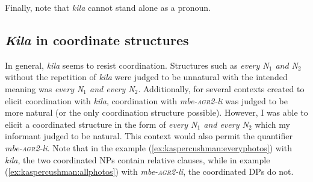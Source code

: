 \documentclass[letterpaper, 12pt]{article}
\begin{document}
Finally, note that \textit{kila} cannot stand alone as a pronoun.

\subsection{\textit{Kila} in coordinate structures}

In general, \textit{kila} seems to resist coordination. Structures such as \textit{every N$_{1}$ and N$_{2}$} without the repetition of \textit{kila} were judged to be unnatural with the intended meaning was \textit{every N$_{1}$ and every N$_{2}$}.  Additionally, for several contexts created to elicit coordination with \textit{kila}, coordination with \textit{mbe-\textsc{agr2}-li} was judged to be more natural (or the only coordination structure possible). However, I was able to elicit a coordinated structure in the form of \textit{every N$_{1}$ and every N$_{2}$} which my informant judged to be natural. This context would also permit the quantifier \textit{mbe-\textsc{agr2}-li}.  Note that in the example (\ref{ex:kaspercushman:everyphotos}) with \textit{kila}, the two coordinated NPs contain relative clauses, while in example (\ref{ex:kaspercushman:allphotos}) with \textit{mbe-\textsc{agr2}-li}, the coordinated DPs do not.
\end{document}

